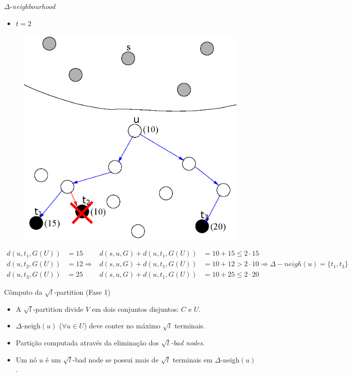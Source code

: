 \documentclass[10pt]{beamer}
\begin{document}
\begin{frame}{$\Delta$-\emph{neighbourhood}}
\begin{itemize}
  \item $t = 2$
\end{itemize}

\begin{figure}[H]
\centering
\includegraphics[scale=0.45]{imagens/neigh_color}
\label{fig:fig}
\end{figure}
\tiny
\begin{align*}
d(u,t_1,G(U)) &= 15 &d(s,u,G) + d(u,t_1,G(U)) &= 10 + 15 \leq 2 \cdot 15 \\
d(u,t_2,G(U)) &= 12 \Rightarrow &d(s,u,G) + d(u,t_1,G(U)) &= 10 + 12 > 2 \cdot 10 \Rightarrow \Delta-neigh(u) = \{t_1,t_3\} \\
d(u,t_3,G(U)) &= 25 &d(s,u,G) + d(u,t_1,G(U)) &= 10 + 25 \leq 2 \cdot 20
\end{align*}
\end{frame}

\begin{frame}{Cômputo da $\sqrt{l}$-partition (Fase 1)}
  \begin{itemize}
    \item A $\sqrt{l}$-partition divide $V$ em dois conjuntos disjuntos: $C$ e $U$.
    \item $\Delta$-neigh$(u)$ ($\forall u \in U$) deve conter no máximo $\sqrt{l}$ terminais.
    \item Partição computada através da eliminação dos \emph{$\sqrt{l}$-bad nodes}.
    \item Um nó $u$ é um $\sqrt{l}$-bad node se possui mais de $\sqrt{l}$ terminais em $\Delta$-neigh$(u)$.
  \end{itemize}
\end{frame}
\end{document}
